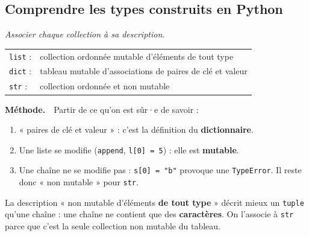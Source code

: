 \documentclass[addpoints, 11pt]{exam}
\newcommand{\enonce}[1]{\textit{#1}\par\smallskip}
\newcommand{\methode}{\par\smallskip\noindent\textbf{Méthode.}\ }
\newcommand{\code}[1]{\texttt{#1}}
\DeclareRobustCommand{\_}{\textunderscore\allowbreak}
\begin{document}
\begin{questions}

\section{Comprendre les types construits en Python}

\question[1] \enonce{Associer chaque collection à sa description.}
\begin{reponse}
\begin{tabular}{ll}
\code{list} : & collection ordonnée mutable d'éléments de tout type \\
\code{dict} : & tableau mutable d'associations de paires de clé et valeur \\
\code{str} : & collection ordonnée et non mutable \\
\end{tabular}
\end{reponse}
\methode\ Partir de ce qu'on est sûr·e de savoir :
\begin{enumerate}
  \item « paires de clé et valeur » : c'est la définition du \textbf{dictionnaire}.
  \item Une liste se modifie (\code{append}, \code{l[0] = 5}) : elle est \textbf{mutable}.
  \item Une chaîne ne se modifie pas : \code{s[0] = "b"} provoque une \code{TypeError}. Il reste donc « non mutable » pour \code{str}.
\end{enumerate}
\begin{remarque}
La description « non mutable d'éléments \textbf{de tout type} » décrit mieux un \code{tuple} qu'une chaîne : une chaîne ne contient que des \textbf{caractères}. On l'associe à \code{str} parce que c'est la seule collection non mutable du tableau.
\end{remarque}


\end{questions}
\end{document}
